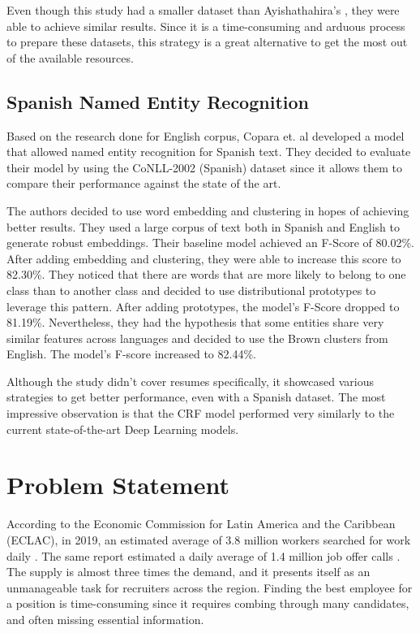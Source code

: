 \documentclass[a4paper, conference]{ieeeconf}
\begin{document}
  Even though this study had a smaller dataset than Ayishathahira's
  \cite{Ayishathahira2018a}, they were able to achieve similar results. Since
  it is a time-consuming and arduous process to prepare these datasets, this
  strategy is a great alternative to get the most out of the available
  resources.

  \subsection{Spanish Named Entity Recognition}
  Based on the research done for English corpus, Copara et. al
  \cite{Copara2016} developed a model that allowed named entity recognition for
  Spanish text. They decided to evaluate their model by using the CoNLL-2002
  (Spanish) dataset since it allows them to compare their performance against
  the state of the art.

  The authors decided to use word embedding and clustering in hopes of
  achieving better results. They used a large corpus of text both in Spanish
  and English to generate robust embeddings. Their baseline model achieved an
  F-Score of 80.02\%. After adding embedding and clustering, they were able to
  increase this score to 82.30\%. They noticed that there are words that are
  more likely to belong to one class than to another class and decided to use
  distributional prototypes to leverage this pattern. After adding prototypes,
  the model's F-Score dropped to 81.19\%. Nevertheless, they had the hypothesis
  that some entities share very similar features across languages and decided
  to use the Brown clusters from English. The model's F-score increased to
  82.44\%.

  Although the study didn't cover resumes specifically, it showcased various
  strategies to get better performance, even with a Spanish dataset. The most
  impressive observation is that the CRF model performed very similarly to the
  current state-of-the-art Deep Learning models.

  \section{Problem Statement} According to the Economic Commission for Latin
  America and the Caribbean (ECLAC), in 2019, an estimated average of 3.8
  million workers searched for work daily \cite{Hilbert2020a}. The same report
  estimated a daily average of 1.4 million job offer calls \cite{Hilbert2020a}.
  The supply is almost three times the demand, and it presents itself as an
  unmanageable task for recruiters across the region. Finding the best employee
  for a position is time-consuming since it requires combing through many
  candidates, and often missing essential information.
\end{document}
